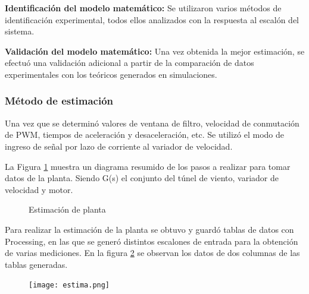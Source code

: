  \textbf{Identificación del modelo matemático:} Se utilizaron varios métodos de identificación experimental, todos ellos analizados con la respuesta al escalón del sistema.

 \textbf{Validación del modelo matemático:} Una vez obtenida la mejor estimación, se efectuó una validación adicional a partir de la comparación de datos experimentales con los teóricos generados en simulaciones.






    \subsubsection{Método de estimación}

    Una vez que se determinó valores de ventana de filtro, velocidad de conmutación de PWM, tiempos de aceleración y desaceleración, etc. Se utilizó el modo de ingreso de señal por lazo de corriente al variador de velocidad. 
    
    La Figura \ref{fig:bloques} muestra un diagrama resumido de los pasos a realizar para tomar datos de la planta. Siendo G(s) el conjunto del túnel de viento, variador de velocidad y motor.
 

\begin{figure}[htbp]
	\centering
	\centering
	\caption{Estimación de planta} \label{fig:bloques}
\end{figure}
 
    
    Para realizar la estimación de la planta se obtuvo y guardó tablas de datos con Processing, en las que se generó distintos escalones de entrada para la obtención de varias mediciones. En la figura \ref{fig:est2} se observan los datos de dos columnas de las tablas generadas.
    
    \begin{figure}[htb]
    	\centering
    	\texttt{[image: estima.png]} %
    	\label{fig:est2}    
    \end{figure}
    

